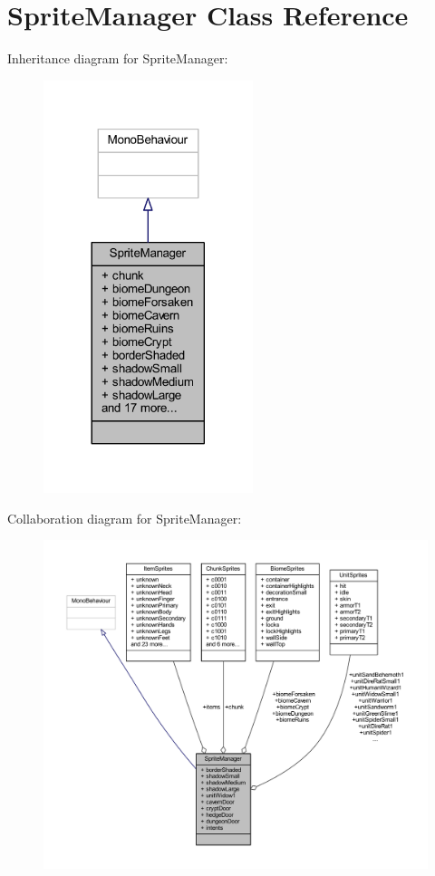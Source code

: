 \hypertarget{class_sprite_manager}{}\section{Sprite\+Manager Class Reference}
\label{class_sprite_manager}


Inheritance diagram for Sprite\+Manager\+:\nopagebreak
\begin{figure}[H]
\begin{center}
\leavevmode
\includegraphics[width=173pt]{class_sprite_manager__inherit__graph}
\end{center}
\end{figure}


Collaboration diagram for Sprite\+Manager\+:\nopagebreak
\begin{figure}[H]
\begin{center}
\leavevmode
\includegraphics[width=350pt]{class_sprite_manager__coll__graph}
\end{center}
\end{figure}
